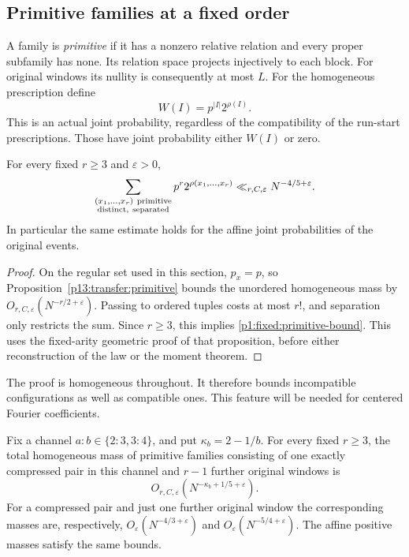 \subsection{Primitive families at a fixed order}

A family is \emph{primitive} if it has a nonzero relative
relation and every proper subfamily has none. Its relation
space projects injectively to each block. For original
windows its nullity is consequently at most \(L\).
For the homogeneous prescription define
\[
 W(I)=p^{|I|}2^{\rho(I)}.
\]
This is an actual joint probability, regardless of the
compatibility of the run-start prescriptions. Those have
joint probability either \(W(I)\) or zero.

\begin{proposition}
\label{p1:fixed:primitive}
For every fixed \(r\ge3\) and \(\varepsilon>0\),
\begin{equation}
 \sum_{\substack{(x_1,\ldots,x_r)\ {\rm primitive}\\
                  {\rm distinct,\ separated}}}
          p^r2^{\rho(x_1,\ldots,x_r)}
        \ll_{r,C,\varepsilon}N^{-4/5+\varepsilon}.
 \label{p1:fixed:primitive-bound}
\end{equation}
In particular the same estimate holds for the affine
joint probabilities of the original events.
\end{proposition}

\begin{proof}
On the regular set used in this section, $p_x=p$, so
Proposition~\ref{p13:transfer:primitive} bounds the unordered homogeneous
mass by $O_{r,C,\varepsilon}(N^{-r/2+\varepsilon})$.
Passing to ordered tuples costs at most $r!$, and separation only
restricts the sum. Since $r\ge3$, this implies
\eqref{p1:fixed:primitive-bound}.
This uses the fixed-arity geometric proof of that proposition,
before either reconstruction of the law or the moment theorem.
\end{proof}

The proof is homogeneous throughout. It therefore bounds
incompatible configurations as well as compatible ones.
This feature will be needed for centered Fourier coefficients.

\begin{proposition}
\label{p1:fixed:compressed}
Fix a channel \(a:b\in\{2:3,3:4\}\), and put
\(\kappa_b=2-1/b\). For every fixed \(r\ge3\), the total
homogeneous mass of primitive families consisting of
one exactly compressed pair in this channel and
\(r-1\) further original windows is
\begin{equation}
 O_{r,C,\varepsilon}
       (N^{-\kappa_b+1/5+\varepsilon}).
 \label{p1:fixed:compressed-bound}
\end{equation}
For a compressed pair and just one further original
window the corresponding masses are, respectively,
\(O_\varepsilon(N^{-4/3+\varepsilon})\) and
\(O_\varepsilon(N^{-5/4+\varepsilon})\).
The affine positive masses satisfy the same bounds.
\end{proposition}

